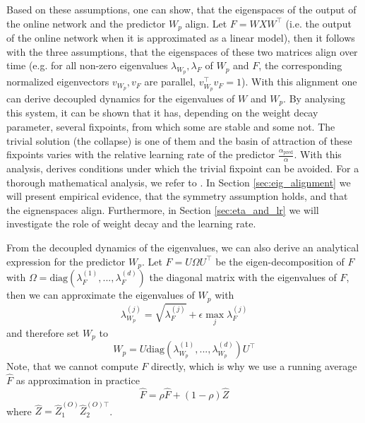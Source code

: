 Based on these assumptions, one can show, that the eigenspaces of the output of the online network and the predictor $W_p$ align. Let $F = WXW^{\top}$ (i.e. the output of the online network when it is approximated as a linear model), then it follows with the three assumptions, that the eigenspaces of these two matrices align over time (e.g. for all non-zero eigenvalues $\lambda_{W_p}, \lambda_F$ of $W_p$ and $F$, the corresponding normalized eigenvectors $v_{W_p}, v_F$ are parallel, $v^{\top}_{W_p}v_F = 1$). With this alignment one can derive decoupled dynamics for the eigenvalues of $W$ and $W_p$. By analysing this system, it can be shown that it has, depending on the weight decay parameter, several fixpoints, from which some are stable and some not. The trivial solution (the collapse) is one of them and the basin of attraction of these fixpoints varies with the relative learning rate of the predictor $\frac{\alpha_{\text{pred}}}{\alpha}$. With this analysis, \cite{tian2021understanding} derives conditions under which the trivial fixpoint can be avoided. For a thorough mathematical analysis, we refer to \cite{tian2021understanding}. 
In Section \ref{sec:eig_alignment} we will present empirical evidence, that the symmetry assumption holds, and that the eignenspaces align. Furthermore, in Section \ref{sec:eta_and_lr} we will investigate the role of weight decay and the learning rate. 

From the decoupled dynamics of the eigenvalues, we can also derive an analytical expression for the predictor $W_p$. Let $F = U \Omega U^{\top}$ be the eigen-decomposition of $F$ with $\Omega = \text{diag}(\lambda^{(1)}_F, ..., \lambda^{(d)}_F)$  the diagonal matrix with the eigenvalues of $F$, then we can approximate the eigenvalues of $W_p$ with
\begin{equation}
    \lambda^{(j)}_{W_p} = \sqrt{\lambda^{(j)}_F} + \epsilon \max_j \lambda^{(j)}_F
\end{equation}
and therefore set $W_p$ to 
\begin{equation}
\label{eq:update}
    W_p = U \text{diag}(\lambda^{(1)}_{W_p}, ..., \lambda^{(d)}_{W_p}) U^{\top}
\end{equation}
Note, that we cannot compute $F$ directly, which is why we use a running average $\hat{F}$ as approximation in practice
\begin{equation}
    \hat{F} = \rho \hat{F} + (1-\rho) \hat{Z}
\end{equation}
where $\hat{Z} = \hat{Z}^{(O)}_1 \hat{Z}^{(O) \top}_2$.

